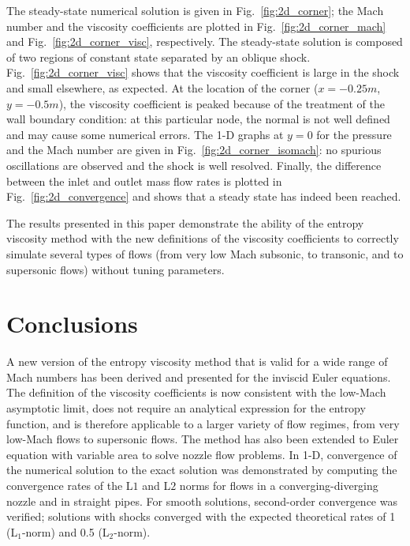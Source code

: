 \documentclass[review,10pt]{elsarticle}
\newcommand{\fig}[1]{Fig.~\ref{#1}}                      %
\begin{document}
%
The steady-state numerical solution is given in \fig{fig:2d_corner}; the Mach number and the viscosity 
coefficients are plotted in \fig{fig:2d_corner_mach} and \fig{fig:2d_corner_visc}, respectively. The 
steady-state solution is composed of two regions of constant state separated by an oblique shock. 
\fig{fig:2d_corner_visc} shows that the viscosity coefficient is large in the shock and small elsewhere, 
as expected. At the location of the corner ($x=-0.25m$, $y=-0.5m$), the viscosity coefficient is peaked 
because of the treatment of the wall boundary condition: at this particular node, the normal is not well 
defined and may cause some numerical errors. The 1-D graphs at $y=0$ for the pressure and the Mach number 
are given in \fig{fig:2d_corner_isomach}: no spurious oscillations are observed and the shock is well resolved. 
Finally, the difference between the inlet and outlet mass flow rates is plotted in \fig{fig:2d_convergence} 
and shows that a steady state has indeed been reached. 

The results presented in this paper demonstrate the ability of the entropy viscosity method with the new definitions of the viscosity coefficients 
to correctly simulate several types of flows (from very low Mach subsonic, to transonic, and to supersonic flows) without tuning parameters.


\section{Conclusions} \label{sec:ccl}

A new version of the entropy viscosity method that is valid for a wide range of Mach numbers has been derived 
and presented for the inviscid Euler equations.
The definition of the viscosity coefficients
is now consistent with the low-Mach asymptotic limit, does not require an analytical expression 
for the entropy function, and is therefore applicable to a larger variety of flow regimes, from very 
low-Mach flows to supersonic flows. 
The method has also been extended to Euler equation with variable area to solve nozzle flow problems.
In 1-D, convergence of the numerical solution to 
the exact solution was demonstrated by computing the convergence rates of the L$1$ and L$2$ norms 
for flows in a converging-diverging nozzle and in straight pipes. For smooth solutions, second-order 
convergence was verified; solutions with shocks converged with the expected theoretical rates of 1 (L$_1$-norm)
and 0.5 (L$_2$-norm).
\end{document}
